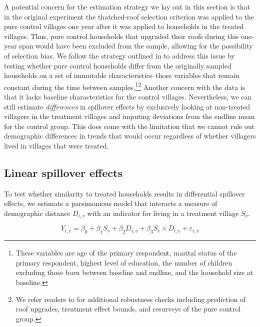 \documentclass[11pt]{article}
\begin{document}
        A potential concern for the estimation strategy we lay out in this section is that in the original experiment the thatched-roof selection criterion was applied to the pure control villages one year after it was applied to households in the treated villages. Thus, pure control households that upgraded their roofs during this one-year span would have been excluded from the sample, allowing for the possibility of selection bias. We follow the strategy outlined in \textcite{haushofer_short-term_2016} to address this issue by testing whether pure control households differ from the originally sampled households on a set of immutable characteristics--those variables that remain constant during the time between samples.\footnote{These variables are age of the primary respondent, marital status of the primary respondent, highest level of education, the number of children excluding those born between baseline and endline, and the household size at baseline.}\footnote{We refer readers to \textcite{haushofer_short-term_2016} for additional robustness checks including prediction of roof upgrades, treatment effect bounds, and resurveys of the pure control group.} Another concern with the data is that it lacks baseline characteristics for the control villages. Nevertheless, we can still estimate \textit{differences} in spillover effects by exclusively looking at non-treated villagers in the treatment villages and imputing deviations from the endline mean for the control group. This does come with the limitation that we cannot rule out demographic differences in trends that would occur regardless of whether villagers lived in villages that were treated.

    \subsection{Linear spillover effects}

        To test whether similarity to treated households results in differential spillover effects, we estimate a parsimonious model that interacts a measure of demographic distance $D_{i,v}$ with an indicator for living in a treatment village $S_v$.

            \begin{equation} \label{eq:interaction}
            Y_{i,v} = \beta_0 + \beta_1 S_v + \beta_2 D_{i,v} + \beta_3 S_v \times  D_{i,v} + \varepsilon_{i,v}
            \end{equation}
\end{document}
